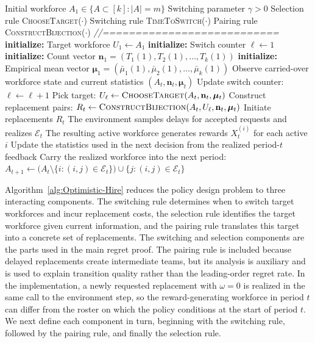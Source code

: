 \documentclass[opre,blindrev]{informs3}
\begin{document}
\begin{algorithm}
    \caption{Optimistic-Hire (\textsc{OH})}
    \label{alg:Optimistic-Hire}
    \begin{algorithmic}[1]
    \Require Initial workforce \(A_1\in \{A\subset [k]: |A|=m\}\) 
    \Require Switching parameter \(\gamma>0\)
    \Require Selection rule \textsc{ChooseTarget}(\(\cdot\))
    \Require Switching rule \textsc{TimeToSwitch}(\(\cdot\))
    \Require Pairing rule \textsc{ConstructBijection}(\(\cdot\))
    \Statex \textit{//===========================}
    \State \textbf{initialize:} Target workforce \(U_1\gets A_1\)
    \State \textbf{initialize:} Switch counter \(\ell\gets 1\) 
    \State \textbf{initialize:} Count vector \(\mathbf{n}_1=(T_1(1), T_2(1),\dots,T_k(1))\)
    \State \textbf{initialize:} Empirical mean vector \(\boldsymbol{\mu}_1=(\bar{\mu}_1(1), \bar{\mu}_2(1),\dots,\bar{\mu}_k(1))\)
        \State Observe carried-over workforce state and current statistics \((A_t,\mathbf{n}_{t},\boldsymbol{\mu}_{t})\)
            \State Update switch counter: \(\ell \gets \ell+1\)
            \State Pick target: \(U_\ell \gets \textsc{ChooseTarget}(A_t, \mathbf{n}_t, \boldsymbol{\mu}_t)\)
            \State Construct replacement pairs: \(R_t \gets \textsc{ConstructBijection}(A_t,U_\ell, \mathbf{n}_t, \boldsymbol{\mu}_t)\)
            \State Initiate replacements \(R_t\)
        \EndIf
        \State The environment samples delays for accepted requests and realizes \(\mathcal{E}_t\)
        \State The resulting active workforce generates rewards \(X_t^{(i)}\) for each active \(i\)
        \State Update the statistics used in the next decision from the realized period-\(t\) feedback
        \State Carry the realized workforce into the next period: \( A_{t+1}\gets\big( A_{t} \setminus \{  i : (i,j) \in \mathcal{E}_t  \} \big) \cup \{  j : (i,j) \in \mathcal{E}_t  \} \)
    \EndFor
    \end{algorithmic}
\end{algorithm}

Algorithm~\ref{alg:Optimistic-Hire} reduces the policy design problem to three interacting components. The switching rule determines when to switch target workforces and incur replacement costs, the selection rule identifies the target workforce given current information, and the pairing rule translates this target into a concrete set of replacements. The switching and selection components are the parts used in the main regret proof. The pairing rule is included because delayed replacements create intermediate teams, but its analysis is auxiliary and is used to explain transition quality rather than the leading-order regret rate. In the implementation, a newly requested replacement with \(\omega=0\) is realized in the same call to the environment step, so the reward-generating workforce in period \(t\) can differ from the roster on which the policy conditions at the start of period \(t\). We next define each component in turn, beginning with the switching rule, followed by the pairing rule, and finally the selection rule.
\end{document}
